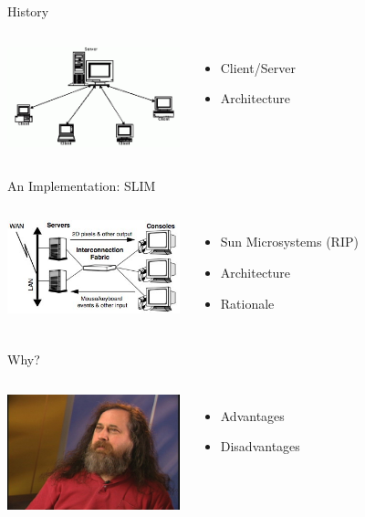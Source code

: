 \documentclass{beamer}
\begin{document}
\begin{frame}{History}
  \begin{columns}
    \column{5cm}
      \includegraphics[width=5cm]{clientServer.png}
    \column{5cm}
      \begin{itemize}
      \item Client/Server
      \item Architecture
      \end{itemize}
  \end{columns}
\end{frame}

\begin{frame}{An Implementation: SLIM}
  \begin{columns}
    \column{5cm}
      \includegraphics[width=5cm]{slimArchitecture.jpg}
    \column{5cm}
      \begin{itemize}
      \item Sun Microsystems (RIP)
      \item Architecture
      \item Rationale
      \end{itemize}
  \end{columns}
\end{frame}

\begin{frame}{Why?}
  \begin{columns}
    \column{5cm}
      \includegraphics[width=5cm]{unixGeek.jpg}
    \column{5cm}
      \begin{itemize}
      \item Advantages
      \item Disadvantages
      \end{itemize}
  \end{columns}
\end{frame}
\end{document}
